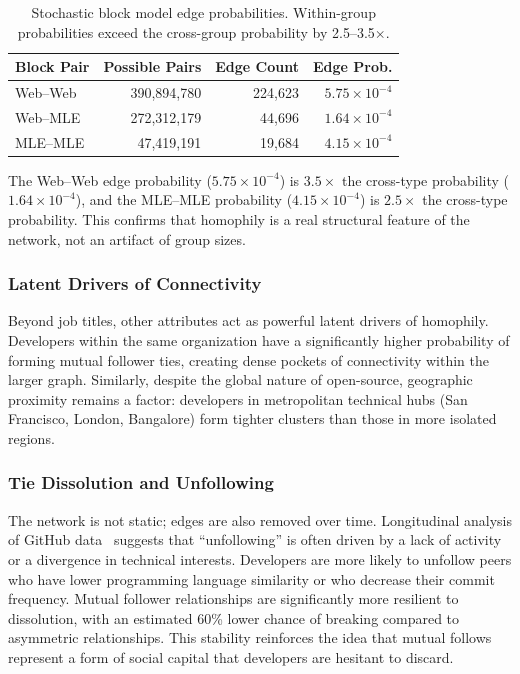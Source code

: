 \documentclass[letterpaper]{article}
\begin{document}
\begin{table}[H]
  \centering
  \begin{tabular}{lrrr}
    \toprule
    \textbf{Block Pair} & \textbf{Possible Pairs} & \textbf{Edge Count} & \textbf{Edge Prob.} \\
    \midrule
    Web--Web   & 390,894,780 & 224,623 & $5.75 \times 10^{-4}$ \\
    Web--MLE   & 272,312,179 & 44,696  & $1.64 \times 10^{-4}$ \\
    MLE--MLE   & 47,419,191  & 19,684  & $4.15 \times 10^{-4}$ \\
    \bottomrule
  \end{tabular}
  \caption{Stochastic block model edge probabilities. Within-group probabilities exceed the cross-group probability by 2.5--3.5$\times$.}
  \label{tab:block_probs}
\end{table}

The Web--Web edge probability ($5.75 \times 10^{-4}$) is $3.5\times$ the cross-type probability ($1.64 \times 10^{-4}$), and the MLE--MLE probability ($4.15 \times 10^{-4}$) is $2.5\times$ the cross-type probability. This confirms that homophily is a real structural feature of the network, not an artifact of group sizes.

\subsubsection{Latent Drivers of Connectivity}

Beyond job titles, other attributes act as powerful latent drivers of homophily. Developers within the same organization have a significantly higher probability of forming mutual follower ties, creating dense pockets of connectivity within the larger graph. Similarly, despite the global nature of open-source, geographic proximity remains a factor: developers in metropolitan technical hubs (San Francisco, London, Bangalore) form tighter clusters than those in more isolated regions.

\subsubsection{Tie Dissolution and Unfollowing}

The network is not static; edges are also removed over time. Longitudinal analysis of GitHub data~\cite{yu2023unfollowing} suggests that ``unfollowing'' is often driven by a lack of activity or a divergence in technical interests. Developers are more likely to unfollow peers who have lower programming language similarity or who decrease their commit frequency. Mutual follower relationships are significantly more resilient to dissolution, with an estimated 60\% lower chance of breaking compared to asymmetric relationships. This stability reinforces the idea that mutual follows represent a form of social capital that developers are hesitant to discard.
\end{document}
